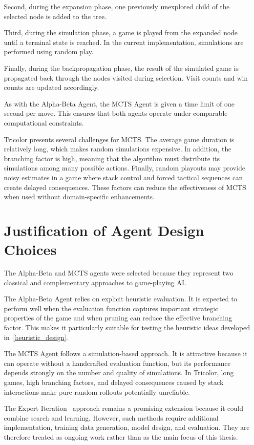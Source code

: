 Second, during the expansion phase, one previously unexplored child of the selected node is added to the tree.

Third, during the simulation phase, a game is played from the expanded node until a terminal state is reached. In the current implementation, simulations are performed using random play.

Finally, during the backpropagation phase, the result of the simulated game is propagated back through the nodes visited during selection. Visit counts and win counts are updated accordingly.

As with the Alpha-Beta Agent, the MCTS Agent is given a time limit of one second per move. This ensures that both agents operate under comparable computational constraints.

Tricolor presents several challenges for MCTS. The average game duration is relatively long, which makes random simulations expensive. In addition, the branching factor is high, meaning that the algorithm must distribute its simulations among many possible actions. Finally, random playouts may provide noisy estimates in a game where stack control and forced tactical sequences can create delayed consequences. These factors can reduce the effectiveness of MCTS when used without domain-specific enhancements.

\section{Justification of Agent Design Choices}

The Alpha-Beta and MCTS agents were selected because they represent two classical and complementary approaches to game-playing AI.

The Alpha-Beta Agent relies on explicit heuristic evaluation. It is expected to perform well when the evaluation function captures important strategic properties of the game and when pruning can reduce the effective branching factor. This makes it particularly suitable for testing the heuristic ideas developed in~\ref{heuristic_design}.

The MCTS Agent follows a simulation-based approach. It is attractive because it can operate without a handcrafted evaluation function, but its performance depends strongly on the number and quality of simulations. In Tricolor, long games, high branching factors, and delayed consequences caused by stack interactions make pure random rollouts potentially unreliable.

The Expert Iteration~\cite{soemers2023stateaction} approach remains a promising extension because it could combine search and learning. However, such methods require additional implementation, training data generation, model design, and evaluation. They are therefore treated as ongoing work rather than as the main focus of this thesis.

